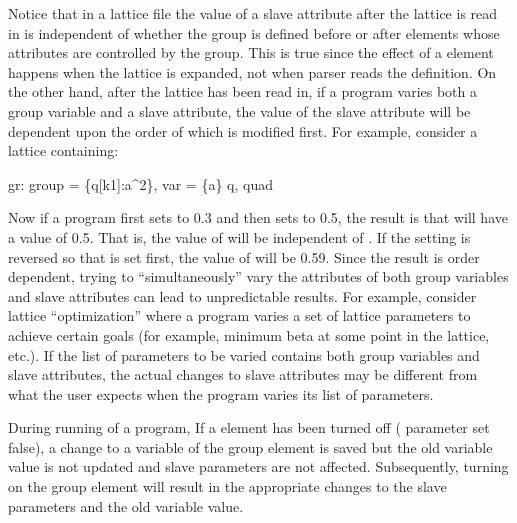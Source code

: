 Notice that in a lattice file the value of a slave attribute after the lattice is read in is
independent of whether the group is defined before or after elements whose attributes are controlled
by the group. This is true since the effect of a  element happens when the lattice is
expanded, not when parser reads the  definition. On the other hand, after the lattice has
been read in, if a program varies both a group variable and a slave attribute, the value of the
slave attribute will be dependent upon the order of which is modified first. For example, consider a
lattice containing:
\begin{example}
  gr: group = \{q[k1]:a^2\}, var = \{a\} 
  q, quad
\end{example}
Now if a program first sets  to 0.3 and then sets  to 0.5, the result is that
 will have a value of 0.5. That is, the value of  will be independent of
. If the setting is reversed so that  is set first, the value of  will
be 0.59. Since the result is order dependent, trying to ``simultaneously'' vary the attributes of
both group variables and slave attributes can lead to unpredictable results. For example, consider
lattice ``optimization'' where a program varies a set of lattice parameters to achieve certain goals
(for example, minimum beta at some point in the lattice, etc.). If the list of parameters to be
varied contains both group variables and slave attributes, the actual changes to slave attributes
may be different from what the user expects when the program varies its list of parameters.

During running of a program, If a  element has been turned off ( parameter set
false), a change to a variable of the group element is saved but the old variable value is not
updated and slave parameters are not affected. Subsequently, turning on the group element will
result in the appropriate changes to the slave parameters and the old variable value.


